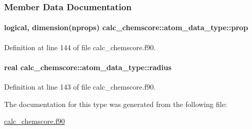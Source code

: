 \subsubsection{Member Data Documentation}
\hypertarget{structcalc__chemscore_1_1atom__data__type_acdc604d24290d9ddaa57870193661416}{
\paragraph[{prop}]{\setlength{\rightskip}{0pt plus 5cm}logical, dimension({\bf nprops}) calc\-\_\-chemscore\-::atom\-\_\-data\-\_\-type\-::prop}}\label{structcalc__chemscore_1_1atom__data__type_acdc604d24290d9ddaa57870193661416}


Definition at line 144 of file calc\-\_\-chemscore.\-f90.

\hypertarget{structcalc__chemscore_1_1atom__data__type_aa6e41ac049f305039fdd01be8860b0b9}{
\paragraph[{radius}]{\setlength{\rightskip}{0pt plus 5cm}real calc\-\_\-chemscore\-::atom\-\_\-data\-\_\-type\-::radius}}\label{structcalc__chemscore_1_1atom__data__type_aa6e41ac049f305039fdd01be8860b0b9}


Definition at line 143 of file calc\-\_\-chemscore.\-f90.



The documentation for this type was generated from the following file\-:\begin{DoxyCompactItemize}
\item 
\hyperlink{calc__chemscore_8f90}{calc\-\_\-chemscore.\-f90}\end{DoxyCompactItemize}
